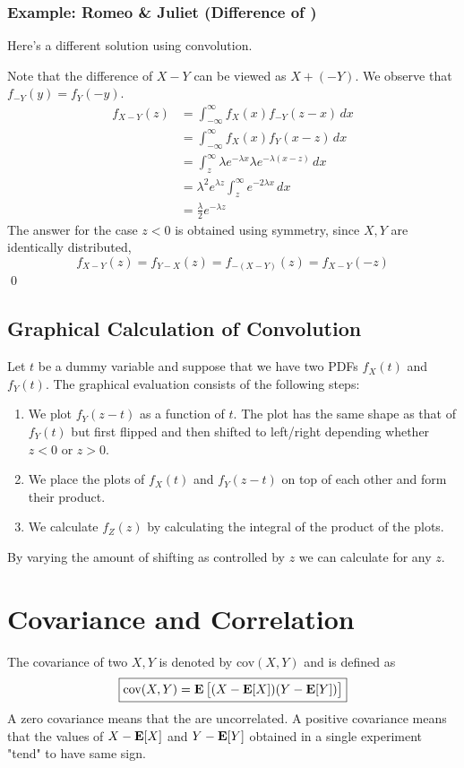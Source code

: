  \subsubsection{Example: Romeo \& Juliet (Difference of \RV)}
 Here's a different solution using convolution.

 Note that the difference of \rv $X-Y$ can be viewed as $X+(-Y)$. We observe that $f_{-Y}(y)=f_Y(-y)$.
 \begin{align*}
     f_{X-Y}(z) &= \int_{-\infty}^{\infty}f_X(x)f_{-Y}(z-x) \, dx \\
      &= \int_{-\infty}^{\infty}f_X(x)f_Y(x-z) \, dx \\
      &= \int_{z}^{\infty} \lambda e^{-\lambda x} \lambda e^{-\lambda(x-z)} \, dx\\
      &= \lambda^2 e^{\lambda z} \int_{z}^{\infty} e^{-2 \lambda x} \, dx \\
      &= \frac{\lambda}{2} e^{-\lambda z}
 \end{align*}
 The answer for the case $z<0$ is obtained using symmetry, since $X, Y$ are identically distributed,
 \[f_{X-Y}(z)=f_{Y-X}(z)=f_{-(X-Y)}(z)=f_{X-Y}(-z)\] \qed

 \subsection{Graphical Calculation of Convolution}

 Let $t$ be a dummy variable and suppose that we have two PDFs $f_X(t)$ and $f_Y(t)$. The graphical evaluation consists of the following steps:
 \begin{enumerate}
     \item We plot $f_Y(z-t)$ as a function of $t$. The plot has the same shape as that of $f_Y(t)$ but first flipped and then shifted to left/right depending whether $z<0$ or $z>0$.
     \item We place the plots of $f_X(t)$ and $f_Y(z-t)$ on top of each other and form their product.
     \item We calculate $f_Z(z)$ by calculating the integral of the product of the plots.
 \end{enumerate}

 By varying the amount of shifting as controlled by $z$ we can calculate for any $z$.

 \section{Covariance and Correlation}
 The covariance of two \rv $X, Y$ is denoted by cov$(X,Y)$ and is defined as
 \[\boxed{\text{cov}(X,Y)=\operatorname{\textbf{E}}\big[(X-\operatorname{\textbf{E}}[X])(Y-\operatorname{\textbf{E}}[Y])\big]}\]
 A zero covariance means that the \rv are uncorrelated. A positive covariance means that the values of $X-\operatorname{\textbf{E}}[X]$ and $Y-\operatorname{\textbf{E}}[Y]$ obtained in a single experiment "tend" to have same sign.

